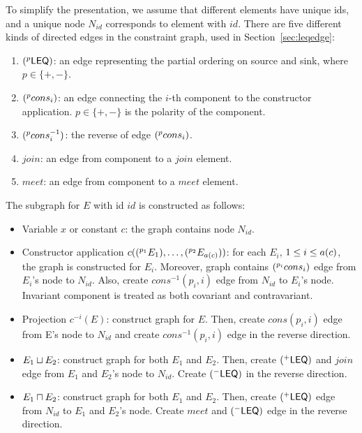 To simplify the presentation, we assume that different elements have
unique ids, and a unique node $N_{id}$ corresponds to element with
$id$. There are five different kinds of directed edges in the
constraint graph, used in Section~\ref{sec:leqedge}:

\begin{enumerate}
\item $(^{p}\mathsf{LEQ})$: an edge representing the partial ordering
on source and sink, where $p\in \{+,-\}$.

\item $(^{p}cons_i)$: an edge connecting the $i$-th component
to the constructor application. $p\in \{+,-\}$ is the polarity of the
component.

\item $(^{p}cons_i^{-1})$: the reverse of edge
$(^{p}cons_i)$.

\item $join$: an edge from component to a $join$ element.

\item $meet$: an edge from component to a $meet$ element.

\end{enumerate}

The subgraph for $E$ with id $id$ is constructed as follows:

\begin{itemize}
\item Variable $x$ or constant $c$: the graph contains node $N_{id}$. 

\item Constructor application $c((^{p_1}E_1), \dots,
(^{p_2}E_{a(c)}))$: for each $E_i$, $1\leq i \leq a(c)$,
the graph is constructed for $E_i$. Moreover, graph contains
$(^{p_i}cons_i)$ edge from $E_i$'s node to $N_{id}$.  Also, create
$cons^{-1}(p_i,i)$ edge from $N_{id}$ to $E_i$'s node. Invariant
component is treated as both covariant and contravariant.

\item Projection $c^{-i}(E)$: construct graph for $E$. Then, create
$cons(p_i,i)$ edge from E's node to $N_{id}$ and create
$cons^{-1}(p_i,i)$ edge in the reverse direction.

\item $E_1\sqcup E_2$: construct graph for both $E_1$ and $E_2$. Then,
create $(^{+}\mathsf{LEQ})$ and $join$ edge from $E_1$ and $E_2$'s node to
$N_{id}$. Create $(^{-}\mathsf{LEQ})$ in the reverse direction.

\item $E_1\sqcap E_2$: construct graph for both $E_1$ and $E_2$. Then,
create $(^{+}\mathsf{LEQ})$ edge from $N_{id}$ to $E_1$ and $E_2$'s
node. Create $meet$ and $(^{-}\mathsf{LEQ})$ edge in the reverse
direction.
\end{itemize}


